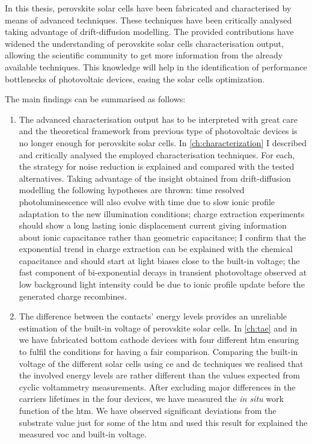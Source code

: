 
In this thesis, perovskite solar cells have been fabricated and characterised by means of advanced techniques.
These techniques have been critically analysed taking advantage of drift\hyp{}diffusion modelling.
The provided contributions have widened the understanding of perovskite solar cells characterisation output, allowing the scientific community to get more information from the already available techniques.
This knowledge will help in the identification of performance bottlenecks of photovoltaic devices, easing the solar cells optimization.

The main findings can be summarised as follows:
\begin{enumerate}
	\item The advanced characterisation output has to be interpreted with great care and the theoretical framework from previous type of photovoltaic devices is no longer enough for perovskite solar cells.
		In \cref{ch:characterization} I described and critically analysed the employed characterisation techniques.
		For each, the strategy for noise reduction is explained and compared with the tested alternatives.
		Taking advantage of the insight obtained from drift\hyp{}diffusion modelling the following hypotheses are thrown:
		time resolved photoluminescence will also evolve with time due to slow ionic profile adaptation to the new illumination conditions;
		charge extraction experiments should show a long lasting ionic displacement current giving information about ionic capacitance rather than geometric capacitance;
		I confirm that the exponential trend in charge extraction can be explained with the chemical capacitance and should start at light biases close to the built-in voltage;
		the fast component of bi\hyp{}exponential decays in transient photovoltage observed at low background light intensity could be due to ionic profile update before the generated charge recombines.

	\item The difference between the contacts' energy levels provides an unreliable estimation of the built-in voltage of perovskite solar cells.
		In \cref{ch:tae} and in \cite{Gelmetti2019} we have fabricated bottom cathode devices with four different \gls{htm} ensuring to fulfil the conditions for having a fair comparison.
		Comparing the built-in voltage of the different solar cells using \gls{ce} and \gls{dc} techniques we realised that the involved energy levels are rather different than the values expected from cyclic voltammetry measurements.
		After excluding major differences in the carriers lifetimes in the four devices, we have measured the \textsl{in situ} work function of the \gls{htm}.
		We have observed significant deviations from the substrate value just for some of the \gls{htm} and used this result for explained the measured \gls{voc} and built-in voltage.


\end{enumerate}
